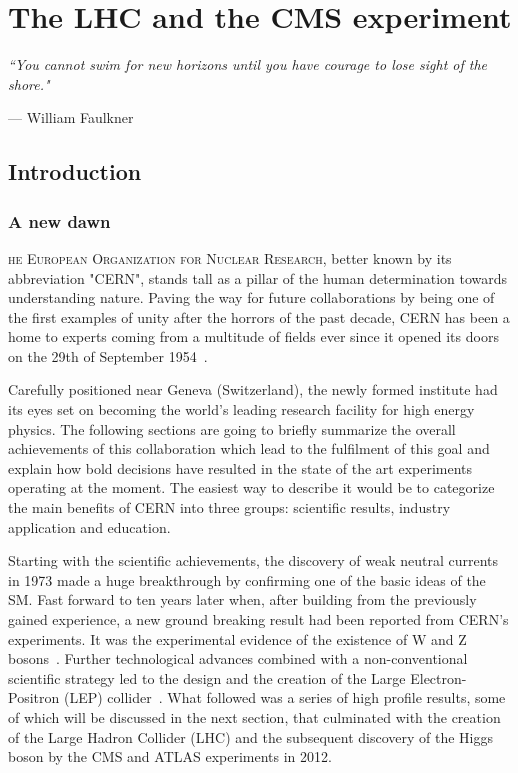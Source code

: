 
\chapter{The LHC and the CMS experiment}
\epigraph{\itshape``You cannot swim for new horizons until you have courage to lose sight of the shore."}{--- \textup{William Faulkner}}


\label{ch:cms_experiment}
\section{Introduction}
\subsection{A new dawn}

\hspace{10pt}\lettrine[lines=2]{}{ he European Organization for Nuclear Research}, better known by its abbreviation "CERN", stands tall as a pillar of the human determination towards understanding nature. Paving the way for future collaborations by being one of the first examples of unity after the horrors of the past decade, CERN has been a home to experts coming from a multitude of fields ever since it opened its doors on the 29th of September 1954~\cite{History_CERN_1}. 

\hspace{10pt} Carefully positioned near Geneva (Switzerland), the newly formed institute had its eyes set on becoming the world's leading research facility for high energy physics. The following sections are going to briefly summarize the overall achievements of this collaboration which lead to the fulfilment of this goal and explain how bold decisions have resulted in the state of the art experiments operating at the moment. The easiest way to describe it would be to categorize the main benefits of CERN into three groups: scientific results, industry application and education.

 \hspace{10pt} Starting with the scientific achievements, the discovery of weak neutral currents~\cite{neutral_currents_1}\cite{neutral_currents_2} in 1973 made a huge breakthrough by confirming one of the basic ideas of the SM. Fast forward to ten years later when, after building from the previously gained experience, a new ground breaking result had been reported from CERN's experiments. It was the experimental evidence of the existence of W and Z bosons~\cite{WandZ_discovery}. Further technological advances combined with a non-conventional scientific strategy led to the design and the creation of the Large Electron-Positron (LEP) collider~\cite{LEP_TDR}. What followed was a series of high profile results, some of which will be discussed in the next section, that culminated with the creation of the Large Hadron Collider (LHC) and the subsequent discovery of the Higgs boson by the CMS and ATLAS experiments in 2012.

